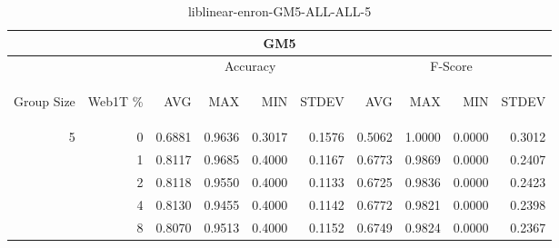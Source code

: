 \begin{center}
\begin{table}[htbp]
\begin{tabular}{ | r | r | r | r | r | r | r | r | r | r |}
\hline
\multicolumn{10}{|c|}{GM5}\\
\hline
 & & \multicolumn{4}{|c|}{Accuracy} & \multicolumn{4}{|c|}{F-Score}\\ \cline{3-10}
\begin{sideways}Group Size\end{sideways} & \begin{sideways}Web1T \%\end{sideways} & \begin{sideways}AVG\end{sideways} & \begin{sideways}MAX\end{sideways} & \begin{sideways}MIN\end{sideways} & \begin{sideways}STDEV\end{sideways} & \begin{sideways}AVG\end{sideways} & \begin{sideways}MAX\end{sideways} & \begin{sideways}MIN\end{sideways} & \begin{sideways}STDEV\end{sideways}\\
\hline
\multirow{4}{*}{5}
 & 0 & 0.6881 & 0.9636 & 0.3017 & 0.1576 & 0.5062 & 1.0000 & 0.0000 & 0.3012\\ \cline{2-10}
 & 1 & 0.8117 & 0.9685 & 0.4000 & 0.1167 & 0.6773 & 0.9869 & 0.0000 & 0.2407\\ \cline{2-10}
 & 2 & 0.8118 & 0.9550 & 0.4000 & 0.1133 & 0.6725 & 0.9836 & 0.0000 & 0.2423\\ \cline{2-10}
 & 4 & 0.8130 & 0.9455 & 0.4000 & 0.1142 & 0.6772 & 0.9821 & 0.0000 & 0.2398\\ \cline{2-10}
 & 8 & 0.8070 & 0.9513 & 0.4000 & 0.1152 & 0.6749 & 0.9824 & 0.0000 & 0.2367\\ \cline{2-10}
\hline
\end{tabular}
\caption{liblinear-enron-GM5-ALL-ALL-5}
\label{table:liblinear-enron-GM5-ALL-ALL-5}
\end{table}
\end{center}

